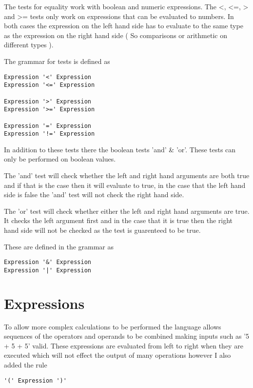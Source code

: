 \documentclass[]{final_report}
\begin{document}
The tests for equality work with boolean and numeric expressions. The \textless, \textless=, \textgreater \vspace{1pt} and \textgreater= tests only work on expressions that can be evaluated to numbers. In both cases the expression on the left hand side has to evaluate to the same type as the expression on the right hand side ( So comparisons or arithmetic on different types  ).

The grammar for tests is defined as

\begin {verbatim}
Expression '<' Expression
Expression '<=' Expression

Expression '>' Expression
Expression '>=' Expression

Expression '=' Expression
Expression '!=' Expression
\end{verbatim}

In addition to these tests there the boolean tests 'and' \& 'or'. These tests can only be performed on boolean values.
 
The 'and' test will check whether the left and right hand arguments are both true and if that is the case then it will evaluate to true, in the case that the left hand side is false the 'and' test will not check the right hand side. 

The 'or' test will check whether either the left and right hand arguments are true. It checks the left argument first and in the case that it is true then the right hand side will not be checked as the test is guarenteed to be true.

These are defined in the grammar as

\begin {verbatim}
Expression '&' Expression
Expression '|' Expression
\end{verbatim}

\section{Expressions}

To allow more complex calculations to be performed the language allows sequences of the operators and operands to be combined making inputs such as '5 + 5 + 5' valid. These expressions are evaluated from left to right when they are executed which will not effect the output of many operations however I also added the rule

\begin{verbatim}
'(' Expression ')'
\end{verbatim}
\end{document}
